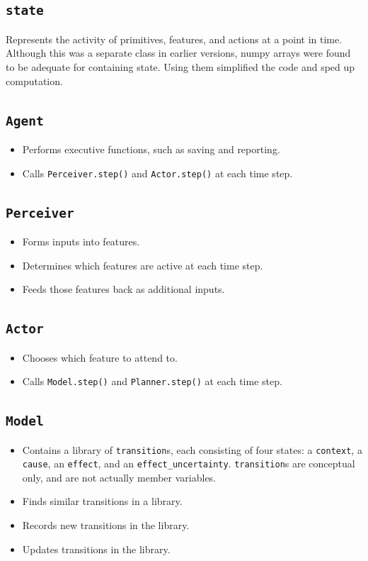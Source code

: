 \subsection{\texttt{state}}
Represents the activity of primitives, features, and actions at a point in time. Although this was a separate class in earlier versions, numpy arrays were found to be adequate for containing state. Using them simplified the code and sped up computation.

\subsection{\texttt{Agent}}
\begin{itemize}
\item Performs executive functions, such as saving and reporting.
\item Calls \texttt{Perceiver.step()} and  \texttt{Actor.step()} at each time step.
\end{itemize}

\subsection{\texttt{Perceiver}}
\begin{itemize}
\item Forms inputs into features.
\item Determines which features are active at each time step.
\item Feeds those features back as additional inputs.
\end{itemize}

\subsection{\texttt{Actor}}
\begin{itemize}
\item Chooses which feature to attend to.
\item Calls \texttt{Model.step()} and  \texttt{Planner.step()} at each time step.
\end{itemize}

\subsection{\texttt{Model}}
\begin{itemize}
\item Contains a library of \texttt{transition}s, each consisting of four states: a \texttt{context}, a \texttt{cause}, an \texttt{effect}, and an \texttt{effect\_uncertainty}.  \texttt{transition}s are conceptual only, and are not actually member variables.
\item Finds similar transitions in a library.
\item Records new transitions in the library.
\item Updates transitions in the library.
\end{itemize}


